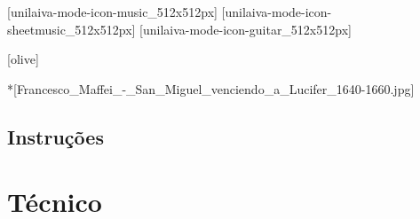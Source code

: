 
\newcommand{\subbooktitle}{Cura}





              [unilaiva-mode-icon-music_512x512px]%
              [unilaiva-mode-icon-sheetmusic_512x512px]%
              [unilaiva-mode-icon-guitar_512x512px]
  \imprintpage

  \toc

  \setcounter{chapter}{0}

    \begin{songs}{}
      
    \end{songs}

    \begin{songs}{}
      
    \end{songs}

  [olive]
    \begin{songs}{}
      
    \end{songs}

  *[Francesco_Maffei_-_San_Miguel_venciendo_a_Lucifer_1640-1660.jpg]
    \section{Instruções}
        
      \begin{songs}{}
        
      \end{songs}
      \begin{songs}{}
        
      \end{songs}
      \begin{songs}{}
        
      \end{songs}

  \appendix

  \ifchorded
    \chapter{Técnico}
      
  \fi


